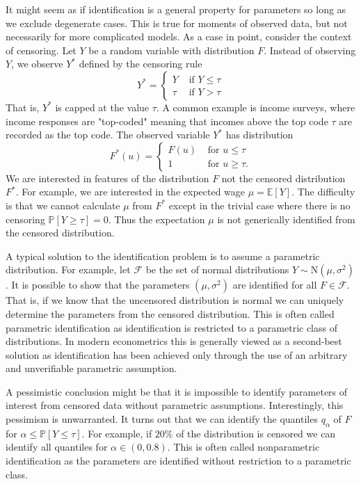 \documentclass[10pt]{article}
\begin{document}
It might seem as if identification is a general property for parameters so long as we exclude degenerate cases. This is true for moments of observed data, but not necessarily for more complicated models. As a case in point, consider the context of censoring. Let $Y$ be a random variable with distribution $F$. Instead of observing $Y$, we observe $Y^{*}$ defined by the censoring rule
$$
Y^{*}=\left\{\begin{array}{cc}
Y & \text { if } Y \leq \tau \\
\tau & \text { if } Y>\tau
\end{array}\right.
$$
That is, $Y^{*}$ is capped at the value $\tau$. A common example is income surveys, where income responses are "top-coded" meaning that incomes above the top code $\tau$ are recorded as the top code. The observed variable $Y^{*}$ has distribution
$$
F^{*}(u)=\left\{\begin{array}{cc}
F(u) & \text { for } u \leq \tau \\
1 & \text { for } u \geq \tau .
\end{array}\right.
$$
We are interested in features of the distribution $F$ not the censored distribution $F^{*}$. For example, we are interested in the expected wage $\mu=\mathbb{E}[Y]$. The difficulty is that we cannot calculate $\mu$ from $F^{*}$ except in the trivial case where there is no censoring $\mathbb{P}[Y \geq \tau]=0$. Thus the expectation $\mu$ is not generically identified from the censored distribution.

A typical solution to the identification problem is to assume a parametric distribution. For example, let $\mathscr{F}$ be the set of normal distributions $Y \sim \mathrm{N}\left(\mu, \sigma^{2}\right)$. It is possible to show that the parameters $\left(\mu, \sigma^{2}\right)$ are identified for all $F \in \mathscr{F}$. That is, if we know that the uncensored distribution is normal we can uniquely determine the parameters from the censored distribution. This is often called parametric identification as identification is restricted to a parametric class of distributions. In modern econometrics this is generally viewed as a second-best solution as identification has been achieved only through the use of an arbitrary and unverifiable parametric assumption.

A pessimistic conclusion might be that it is impossible to identify parameters of interest from censored data without parametric assumptions. Interestingly, this pessimism is unwarranted. It turns out that we can identify the quantiles $q_{\alpha}$ of $F$ for $\alpha \leq \mathbb{P}[Y \leq \tau]$. For example, if $20 \%$ of the distribution is censored we can identify all quantiles for $\alpha \in(0,0.8)$. This is often called nonparametric identification as the parameters are identified without restriction to a parametric class.
\end{document}
